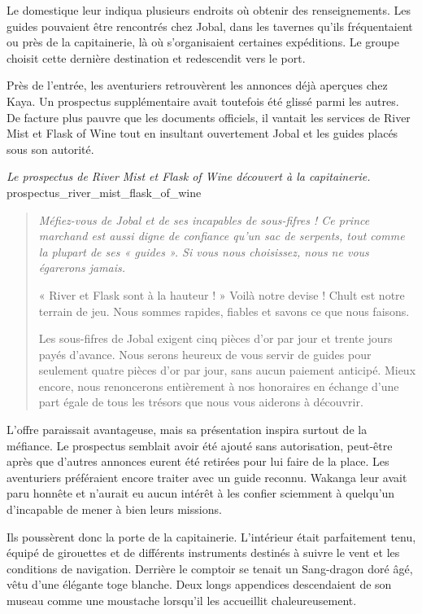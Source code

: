 Le domestique leur indiqua plusieurs endroits où obtenir des renseignements. Les guides pouvaient être rencontrés chez Jobal, dans les tavernes qu'ils fréquentaient ou près de la capitainerie, là où s'organisaient certaines expéditions. Le groupe choisit cette dernière destination et redescendit vers le port.

Près de l'entrée, les aventuriers retrouvèrent les annonces déjà aperçues chez Kaya. Un prospectus supplémentaire avait toutefois été glissé parmi les autres. De facture plus pauvre que les documents officiels, il vantait les services de River Mist et Flask of Wine tout en insultant ouvertement Jobal et les guides placés sous son autorité.

{\textit{Le prospectus de River Mist et Flask of Wine découvert à la capitainerie.}}
{prospectus_river_mist_flask_of_wine}

\begin{quote}\itshape
Méfiez-vous de Jobal et de ses incapables de sous-fifres ! Ce prince marchand est aussi digne de confiance qu'un sac de serpents, tout comme la plupart de ses « guides ». Si vous nous choisissez, nous ne vous égarerons jamais.

« River et Flask sont à la hauteur ! » Voilà notre devise ! Chult est notre terrain de jeu. Nous sommes rapides, fiables et savons ce que nous faisons.

Les sous-fifres de Jobal exigent cinq pièces d'or par jour et trente jours payés d'avance. Nous serons heureux de vous servir de guides pour seulement quatre pièces d'or par jour, sans aucun paiement anticipé. Mieux encore, nous renoncerons entièrement à nos honoraires en échange d'une part égale de tous les trésors que nous vous aiderons à découvrir.
\end{quote}

L'offre paraissait avantageuse, mais sa présentation inspira surtout de la méfiance. Le prospectus semblait avoir été ajouté sans autorisation, peut-être après que d'autres annonces eurent été retirées pour lui faire de la place. Les aventuriers préféraient encore traiter avec un guide reconnu. Wakanga leur avait paru honnête et n'aurait eu aucun intérêt à les confier sciemment à quelqu'un d'incapable de mener à bien leurs missions.

Ils poussèrent donc la porte de la capitainerie. L'intérieur était parfaitement tenu, équipé de girouettes et de différents instruments destinés à suivre le vent et les conditions de navigation. Derrière le comptoir se tenait un Sang-dragon doré âgé, vêtu d'une élégante toge blanche. Deux longs appendices descendaient de son museau comme une moustache lorsqu'il les accueillit chaleureusement.

